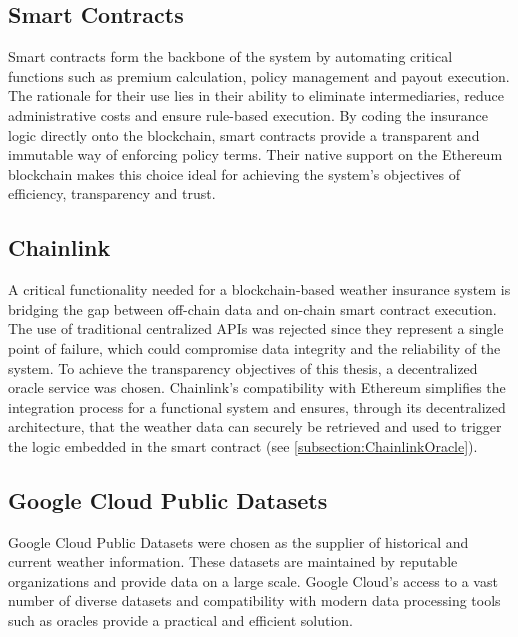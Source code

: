 \subsection{Smart Contracts}
Smart contracts form the backbone of the system by automating critical functions such as premium calculation, policy management and payout execution. The rationale for their use lies in their ability to eliminate intermediaries, reduce administrative costs and ensure rule-based execution. By coding the insurance logic directly onto the blockchain, smart contracts provide a transparent and immutable way of enforcing policy terms. Their native support on the Ethereum blockchain makes this choice ideal for achieving the system's objectives of efficiency, transparency and trust.

\subsection{Chainlink}
A critical functionality needed for a blockchain-based weather insurance system is bridging the gap between off-chain data and on-chain smart contract execution. The use of traditional centralized APIs was rejected since they represent a single point of failure, which could compromise data integrity and the reliability of the system. To achieve the transparency objectives of this thesis, a decentralized oracle service was chosen. Chainlink's compatibility with Ethereum simplifies the integration process for a functional system and ensures, through its decentralized architecture, that the weather data can securely be retrieved and used to trigger the logic embedded in the smart contract (see \cref{subsection:ChainlinkOracle}).

\subsection{Google Cloud Public Datasets}
Google Cloud Public Datasets were chosen as the supplier of historical and current weather information. These datasets are maintained by reputable organizations and provide data on a large scale. Google Cloud's access to a vast number of diverse datasets and compatibility with modern data processing tools such as oracles provide a practical and efficient solution.